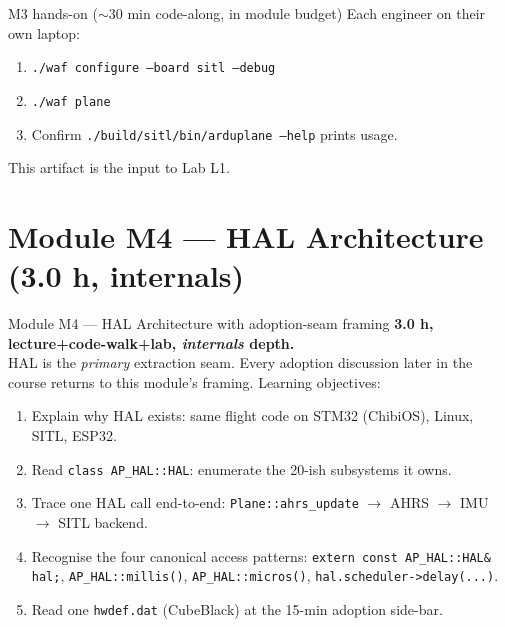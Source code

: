 \documentclass[aspectratio=169,11pt]{beamer}
\begin{document}
\begin{frame}[allowframebreaks]{M3 hands-on ($\sim$30 min code-along, in module budget)}
  Each engineer on their own laptop:
  \begin{enumerate}
    \item \texttt{./waf configure --board sitl --debug}
    \item \texttt{./waf plane}
    \item Confirm \texttt{./build/sitl/bin/arduplane --help} prints usage.
  \end{enumerate}
  \vfill
  This artifact is the input to Lab L1.
\end{frame}

\section{Module M4 --- HAL Architecture (3.0 h, internals)}

\begin{frame}{Module M4 --- HAL Architecture with adoption-seam framing}
  \textbf{3.0 h, lecture+code-walk+lab, \emph{internals} depth.}\\[1ex]
  HAL is the \emph{primary} extraction seam. Every adoption discussion later in the course returns to this module's framing.
  \vfill
  Learning objectives:
  \begin{enumerate}
    \item Explain why HAL exists: same flight code on STM32 (ChibiOS), Linux, SITL, ESP32.
    \item Read \texttt{class AP\_HAL::HAL}: enumerate the 20-ish subsystems it owns.
    \item Trace one HAL call end-to-end: \texttt{Plane::ahrs\_update} $\rightarrow$ AHRS $\rightarrow$ IMU $\rightarrow$ SITL backend.
    \item Recognise the four canonical access patterns: \texttt{extern const AP\_HAL::HAL\& hal;}, \texttt{AP\_HAL::millis()}, \texttt{AP\_HAL::micros()}, \texttt{hal.scheduler->delay(...)}.
    \item Read one \texttt{hwdef.dat} (CubeBlack) at the 15-min adoption side-bar.
  \end{enumerate}
\end{frame}
\end{document}
